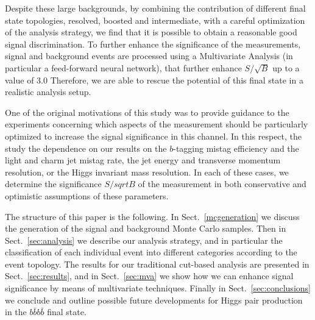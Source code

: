 Despite these large backgrounds, by combining the contribution of different final state
topologies, resolved, boosted and intermediate, with a careful optimization
of the analysis strategy, we find that it is possible to obtain a reasonable
good signal discrimination.
%
To further enhance the significance of the measurements, signal and background events
are processed using a Multivariate Analysis (in particular a feed-forward neural
network), that further enhance $S/\sqrt{B}$ up to a value of 3.0
%
Therefore, we are able to rescue the potential of this final state in a realistic
analysis setup.

One of the original motivations of this study was to provide guidance to the experiments
concerning which aspects of the measurement should be particularly optimized
to increase the signal significance in this channel.
%
In this respect, the study the dependence on our results on the $b$-tagging mistag
efficiency and the light and charm jet mistag rate, the jet energy and transverse
momentum resolution, or the Higgs invariant mass resolution.
%
In each of these cases, we determine the significance  $S/sqrt{B}$ of the
measurement in both conservative and optimistic assumptions of these
parameters.


The structure of this paper is the following.
%
In Sect.~\ref{mcgeneration} we discuss the generation of the signal
and background Monte Carlo samples.
%
Then in Sect.~\ref{sec:analysis}
we describe our analysis strategy, and in particular
the classification of each individual event into
different categories according to the event topology.
%
The results for our traditional cut-based analysis
are presented in Sect.~\ref{sec:results}, and in
Sect.~\ref{sec:mva} we show how we can enhance signal
significance by means of multivariate techniques.
%
Finally in Sect.~\ref{sec:conclusions} we conclude and outline
possible future developments for Higgs pair production
in the $b\bar{b}b\bar{b}$ final state.
